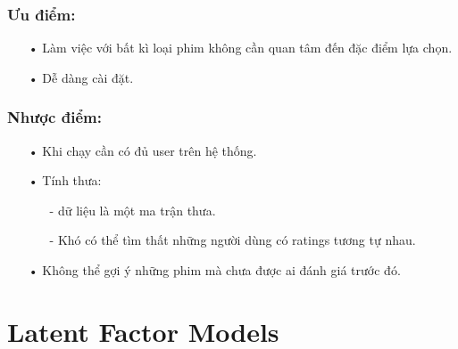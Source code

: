 \documentclass[a4paper,10pt]{report}
\begin{document}
\subsection{Ưu điểm:}
\begin{itemize}
\item[•] Làm việc với bất kì loại phim không cần quan tâm đến đặc điểm lựa chọn.
\item[•] Dễ dàng cài đặt. 
\end{itemize}
\subsection{Nhược điểm:}
\begin{itemize}
\item[•] Khi chạy cần có đủ user trên hệ thống.
\item[•] Tính thưa:
\begin{itemize}
\item[-] dữ liệu là một ma trận thưa.
\item[-] Khó có thể tìm thất những người dùng có ratings tương tự nhau.
\end{itemize}
\item[•] Không thể gợi ý những phim mà chưa được ai đánh giá trước đó.
\end{itemize}
\chapter{Latent Factor Models}
\end{document}
